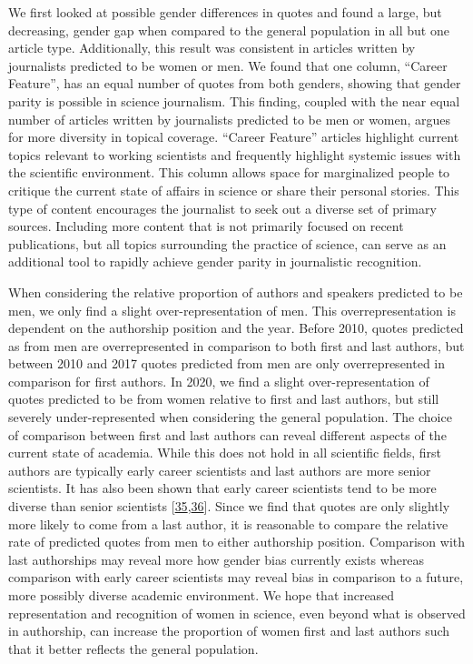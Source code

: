 We first looked at possible gender differences in quotes and found a large, but decreasing, gender gap when compared to the general population in all but one article type.
Additionally, this result was consistent in articles written by journalists predicted to be women or men.
We found that one column, ``Career Feature'', has an equal number of quotes from both genders, showing that gender parity is possible in science journalism.
This finding, coupled with the near equal number of articles written by journalists predicted to be men or women, argues for more diversity in topical coverage.
``Career Feature'' articles highlight current topics relevant to working scientists and frequently highlight systemic issues with the scientific environment.
This column allows space for marginalized people to critique the current state of affairs in science or share their personal stories.
This type of content encourages the journalist to seek out a diverse set of primary sources.
Including more content that is not primarily focused on recent publications, but all topics surrounding the practice of science, can serve as an additional tool to rapidly achieve gender parity in journalistic recognition.

When considering the relative proportion of authors and speakers predicted to be men, we only find a slight over-representation of men. This overrepresentation is dependent on the authorship position and the year.
Before 2010, quotes predicted as from men are overrepresented in comparison to both first and last authors, but between 2010 and 2017 quotes predicted from men are only overrepresented in comparison for first authors.
In 2020, we find a slight over-representation of quotes predicted to be from women relative to first and last authors, but still severely under-represented when considering the general population.
The choice of comparison between first and last authors can reveal different aspects of the current state of academia.
While this does not hold in all scientific fields, first authors are typically early career scientists and last authors are more senior scientists.
It has also been shown that early career scientists tend to be more diverse than senior scientists {[}\protect\hyperlink{ref-x9r6ibH3}{35},\protect\hyperlink{ref-17yLwqExi}{36}{]}.
Since we find that quotes are only slightly more likely to come from a last author, it is reasonable to compare the relative rate of predicted quotes from men to either authorship position.
Comparison with last authorships may reveal more how gender bias currently exists whereas comparison with early career scientists may reveal bias in comparison to a future, more possibly diverse academic environment.
We hope that increased representation and recognition of women in science, even beyond what is observed in authorship, can increase the proportion of women first and last authors such that it better reflects the general population.

